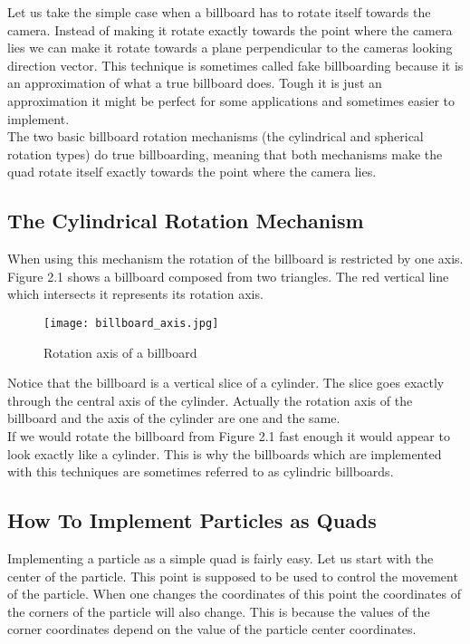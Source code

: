 Let us take the simple case when a billboard has to rotate itself towards the camera. Instead of making it rotate exactly towards the point where the camera lies we can make it rotate towards a plane perpendicular to the cameras looking direction vector. This technique is sometimes called fake billboarding because it is an approximation of what a true billboard does. Tough it is just an approximation it might be perfect for some applications and sometimes easier to implement.\\

The two basic billboard rotation mechanisms (the cylindrical and spherical rotation types) do true billboarding, meaning that both mechanisms make the quad rotate itself exactly towards the point where the camera lies.

\newpage
\subsection{The Cylindrical Rotation Mechanism}
When using this mechanism the rotation of the billboard is restricted by one axis. Figure 2.1 shows a billboard composed from two triangles. The red vertical line which intersects it represents its rotation axis.

\begin{figure}[h]
	\caption{Rotation axis of a billboard}
	\centering
	\texttt{[image: billboard\_axis.jpg]}
\end{figure}

Notice that the billboard is a vertical slice of a cylinder. The slice goes exactly through the central axis of the cylinder. Actually the rotation axis of the billboard and the axis of the cylinder are one and the same.\\

If we would rotate the billboard from Figure 2.1 fast enough it would appear to look exactly like a cylinder. This is why the billboards which are implemented with this techniques are sometimes referred to as cylindric billboards.\\

\newpage
\subsection{How To Implement Particles as Quads}
Implementing a particle as a simple quad is fairly easy. Let us start with the center of the particle. This point is supposed to be used to control the movement of the particle. When one changes the coordinates of this point the coordinates of the corners of the particle will also change. This is because the values of the corner coordinates depend on the value of the particle center coordinates.\\

